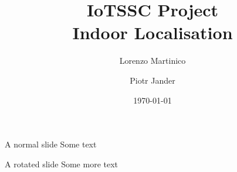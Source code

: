 \documentclass[landscape]{infslides}
\begin{document}
\title[IoTSSC Project]{IoTSSC Project\\Indoor Localisation}
{}
\author[Lorenzo Martinico and Piotr Jander]{Lorenzo Martinico \and Piotr Jander}
\date{\today}

\maketitle

\begin{slide}{A normal slide}
    Some text
\end{slide}

\begin{sliderotated}{A rotated slide}
    Some more text
\end{sliderotated}
\end{document}
